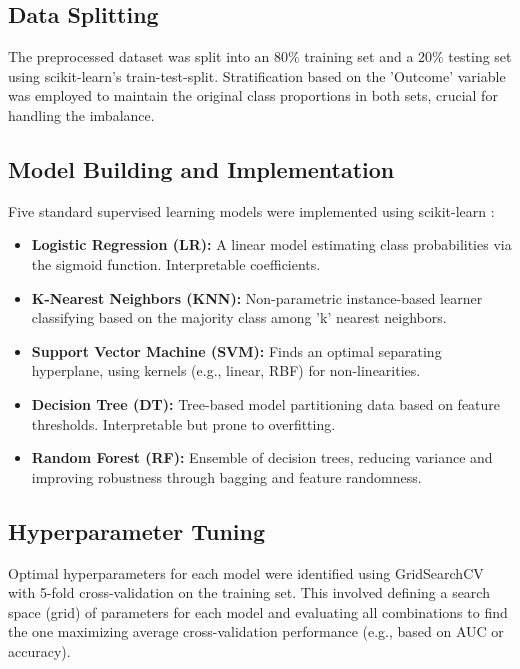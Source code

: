 \documentclass[conference]{IEEEtran}
\begin{document}
\subsection{Data Splitting}
The preprocessed dataset was split into an 80\% training set and a 20\% testing set using scikit-learn's train-test-split. Stratification based on the 'Outcome' variable was employed to maintain the original class proportions in both sets, crucial for handling the imbalance.

\subsection{Model Building and Implementation}
Five standard supervised learning models were implemented using scikit-learn \cite{scikit-learn}:
\begin{itemize}
    \item \textbf{Logistic Regression (LR):} A linear model estimating class probabilities via the sigmoid function. Interpretable coefficients.
    \item \textbf{K-Nearest Neighbors (KNN):} Non-parametric instance-based learner classifying based on the majority class among 'k' nearest neighbors.
    \item \textbf{Support Vector Machine (SVM):} Finds an optimal separating hyperplane, using kernels (e.g., linear, RBF) for non-linearities.
    \item \textbf{Decision Tree (DT):} Tree-based model partitioning data based on feature thresholds. Interpretable but prone to overfitting.
    \item \textbf{Random Forest (RF):} Ensemble of decision trees, reducing variance and improving robustness through bagging and feature randomness.
\end{itemize}

\subsection{Hyperparameter Tuning}
Optimal hyperparameters for each model were identified using GridSearchCV with 5-fold cross-validation on the training set. This involved defining a search space (grid) of parameters for each model and evaluating all combinations to find the one maximizing average cross-validation performance (e.g., based on AUC or accuracy).
\end{document}
